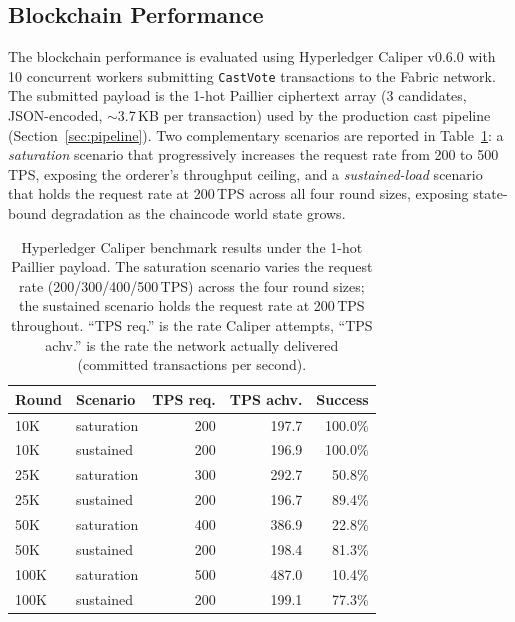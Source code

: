 \subsection{Blockchain Performance}
\label{subsec:blockchain-perf}

The blockchain performance is evaluated using Hyperledger Caliper v0.6.0 with 10 concurrent workers submitting \texttt{CastVote} transactions to the Fabric network. The submitted payload is the 1-hot Paillier ciphertext array (3 candidates, JSON-encoded, $\sim$3.7\,KB per transaction) used by the production cast pipeline (Section~\ref{sec:pipeline}). Two complementary scenarios are reported in Table~\ref{tab:caliper}: a \emph{saturation} scenario that progressively increases the request rate from 200 to 500\,TPS, exposing the orderer's throughput ceiling, and a \emph{sustained-load} scenario that holds the request rate at 200\,TPS across all four round sizes, exposing state-bound degradation as the chaincode world state grows.

\begin{table}[H]
\centering
\caption[Hyperledger Caliper benchmark results --- saturation vs sustained-load scenarios]{Hyperledger Caliper benchmark results under the 1-hot Paillier payload. The saturation scenario varies the request rate (200/300/400/500\,TPS) across the four round sizes; the sustained scenario holds the request rate at 200\,TPS throughout. ``TPS req.'' is the rate Caliper attempts, ``TPS achv.'' is the rate the network actually delivered (committed transactions per second).}
\label{tab:caliper}
\small
\begin{tabular}{|l|l|r|r|r|}
\hline
\textbf{Round} & \textbf{Scenario} & \textbf{TPS req.} & \textbf{TPS achv.} & \textbf{Success} \\
\hline
10K  & saturation  & 200 & 197.7 & 100.0\% \\
10K  & sustained   & 200 & 196.9 & 100.0\% \\
\hline
25K  & saturation  & 300 & 292.7 & 50.8\% \\
25K  & sustained   & 200 & 196.7 & 89.4\% \\
\hline
50K  & saturation  & 400 & 386.9 & 22.8\% \\
50K  & sustained   & 200 & 198.4 & 81.3\% \\
\hline
100K & saturation  & 500 & 487.0 & 10.4\% \\
100K & sustained   & 200 & 199.1 & 77.3\% \\
\hline
\end{tabular}
\end{table}

